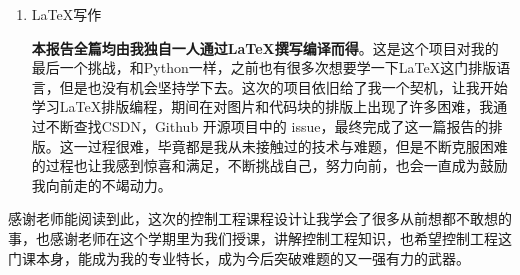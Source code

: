 \documentclass[12pt]{ctexart}
\begin{document}
\begin{enumerate}
	\item \LaTeX 写作

\textbf{本报告全篇均由我独自一人通过\LaTeX 撰写编译而得}。这是这个项目对我的最后一个挑战，和Python一样，之前也有很多次想要学一下\LaTeX 这门排版语言，但是也没有机会坚持学下去。这次的项目依旧给了我一个契机，让我开始学习\LaTeX 排版编程，期间在对图片和代码块的排版上出现了许多困难，我通过不断查找CSDN，Github 开源项目中的 issue，最终完成了这一篇报告的排版。这一过程很难，毕竟都是我从未接触过的技术与难题，但是不断克服困难的过程也让我感到惊喜和满足，不断挑战自己，努力向前，也会一直成为鼓励我向前走的不竭动力。

\end{enumerate}

感谢老师能阅读到此，这次的控制工程课程设计让我学会了很多从前想都不敢想的事，也感谢老师在这个学期里为我们授课，讲解控制工程知识，也希望控制工程这门课本身，能成为我的专业特长，成为今后突破难题的又一强有力的武器。
\end{document}
